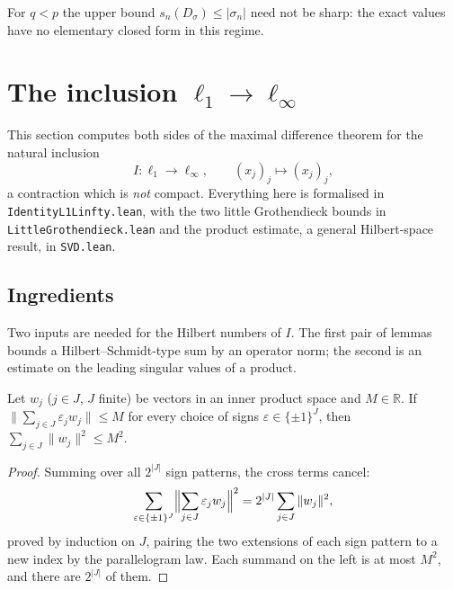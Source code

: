 For $q < p$ the upper bound $s_n(D_\sigma) \le |\sigma_n|$ need not be
sharp: the exact values have no elementary closed form in this regime.

\section{The inclusion \texorpdfstring{$\ell_1 \to \ell_\infty$}{l1 to linfty}}
\label{sec:l1-linf}

This section computes both sides of the maximal difference theorem for the
natural inclusion
\[
  I \colon \ell_1 \to \ell_\infty, \qquad (x_j)_j \mapsto (x_j)_j ,
\]
a contraction which is \emph{not} compact. Everything here is formalised in
\texttt{IdentityL1Linfty.lean}, with the two little Grothendieck bounds in
\texttt{LittleGrothendieck.lean} and the product estimate, a general
Hilbert-space result, in \texttt{SVD.lean}.

\subsection{Ingredients}
\label{sec:l1-linf-ingredients}

Two inputs are needed for the Hilbert numbers of $I$. The first pair of
lemmas bounds a Hilbert--Schmidt-type sum by an operator norm; the second is
an estimate on the leading singular values of a product.

\begin{lemma}
\label{lem:sign-averaging}
\leanok
Let $w_j$ ($j \in J$, $J$ finite) be vectors in an inner product space and
$M \in \mathbb{R}$. If $\|\sum_{j \in J} \varepsilon_j w_j\| \le M$ for every
choice of signs $\varepsilon \in \{\pm 1\}^J$, then
$\sum_{j \in J} \|w_j\|^2 \le M^2$.
\end{lemma}
\begin{proof}
\leanok
Summing over all $2^{|J|}$ sign patterns, the cross terms cancel:
\[
  \sum_{\varepsilon \in \{\pm 1\}^J} \Bigl\| \sum_{j \in J} \varepsilon_j w_j \Bigr\|^2
  = 2^{|J|} \sum_{j \in J} \|w_j\|^2 ,
\]
proved by induction on $J$, pairing the two extensions of each sign pattern to a
new index by the parallelogram law. Each summand on the left is at most $M^2$,
and there are $2^{|J|}$ of them.
\end{proof}

